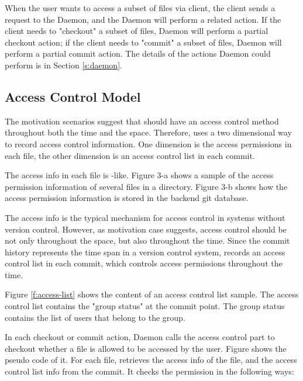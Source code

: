 When the user wants to access a subset of files via \sys client, the client
sends a request to the \Sys Daemon, and the \Sys Daemon will perform a related
action. If the client needs to "checkout" a subset of files, \Sys Daemon will
perform a partial checkout action; if the client needs to "commit" a subset of
files, \Sys Daemon will perform a partial commit action. The details of the
actions \Sys Daemon could perform is in Section \ref{s:daemon}.


\subsection{Access Control Model}

The motivation scenarios suggest that \sys should have an access control method
throughout both the time and the space. 
Therefore, \sys uses a two dimensional  way to record
access control information. One dimension is the access permissions in each
file, the other dimension is an access control list in each commit.

The access info in each file is \unix-like.
Figure 3-a  shows a sample of the access permission
information of several files in a directory. Figure 3-b
shows how the access
permission information is stored in the backend git database.

The access info is the typical mechanism for access control in systems
without version control. However, as motivation case  suggests, access control should be not only
throughout the space, but also throughout the time. Since the
commit history represents the time span in a version control system, \sys
records an access control list in each commit, which controls access permissions
throughout the time.



Figure \ref{f:access-list} shows the content of an access control
list sample. The access control list contains the "group status" at the commit
point. The group status contains the list of users that belong to the group.

In each checkout or commit action, \Sys Daemon calls the access control part to
checkout whether a file is allowed to be accessed by the user. Figure
 shows the pseudo code of it.
For each file, \sys retrieves the access info of the file, and the access
control list info from the commit. It checks the permission in the following
ways:

